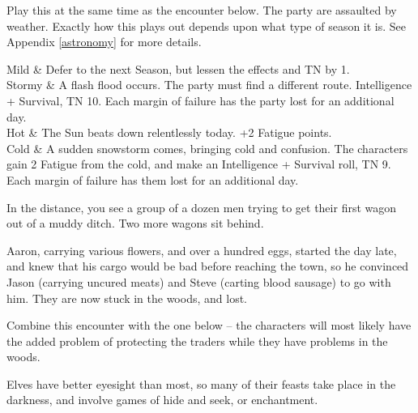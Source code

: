 \begin{multicols}{2}

Play this at the same time as the encounter below.
The party are assaulted by weather.
Exactly how this plays out depends upon what type of season it is.
See Appendix \ref{astronomy} for more details.

\vfill\null

\begin{rollchart}

	Mild & Defer to the next Season, but lessen the effects and TN by 1. \\
	Stormy & A flash flood occurs.  The party must find a different route.  Intelligence + Survival, TN 10.  Each margin of failure has the party lost for an additional day. \\
	Hot & The Sun beats down relentlessly today.  +2 Fatigue points. \\
	Cold & A sudden snowstorm comes, bringing cold and confusion.  The characters gain 2 Fatigue from the cold, and make an Intelligence + Survival roll, TN 9.  Each margin of failure has them lost for an additional day.

\end{rollchart}


\begin{boxtext}
	In the distance, you see a group of a dozen men trying to get their first wagon out of a muddy ditch.  Two more wagons sit behind.
\end{boxtext}

Aaron, carrying various flowers, and over a hundred eggs, started the day late, and knew that his cargo would be bad before reaching the town, so he convinced Jason (carrying uncured meats) and Steve (carting blood sausage) to go with him.  They are now stuck in the woods, and lost.

Combine this encounter with the one below -- the characters will most likely have the added problem of protecting the traders while they have problems in the woods.


\humantrader


Elves have better eyesight than most, so many of their feasts take place in the darkness, and involve games of hide and seek, or enchantment.


\end{multicols}
